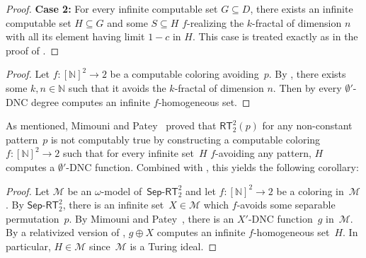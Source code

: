 \documentclass{article}
\newtheorem{theorem}{Theorem}
\numberwithin{theorem}{section}
\newtheorem{corollary}[theorem]{Corollary}
\def\M{\mathcal{M}}
\newcommand{\RT}[0]{\mathsf{RT}}
\newcommand{\coRT}[0]{\mathsf{coRT}}
\newcommand{\SepRT}[0]{\mathsf{Sep}\mbox{-}\mathsf{RT}}
\newcommand{\NN}[0]{\mathbb{N}}
\begin{document}
\begin{proof}
\textbf{Case 2:} For every infinite computable set $G \subseteq D$, there exists an infinite computable set $H \subseteq G$ and some $S \subseteq H$ $f$-realizing the $k$-fractal of dimension $n$ with all its element having limit $1 - c$ in $H$. This case is treated exactly as in the proof of .

\end{proof}

\begin{proof}
Let $f : [\NN]^2 \to 2$ be a computable coloring avoiding~$p$.
By , there exists some $k,n \in \NN$ such that it avoids the $k$-fractal of dimension $n$. Then by  every $\emptyset'$-DNC degree computes an infinite $f$-homogeneous set.
\end{proof}

As mentioned, Mimouni and Patey~\cite{mimouni2025ramseylike} proved that $\RT^2_2(p)$ for any non-constant pattern~$p$ is not computably true by constructing a computable coloring $f : [\NN]^2 \to 2$ such that for every infinite set~$H$ $f$-avoiding any pattern, $H$ computes a $\emptyset'$-DNC function. Combined with , this yields the following corollary:

\begin{proof}
Let $\M$ be an $\omega$-model of~$\SepRT^2_2$
and let $f : [\NN]^2 \to 2$ be a coloring in~$\M$.
By $\SepRT^2_2$, there is an infinite set~$X \in \M$ which $f$-avoids some separable permutation~$p$.
By Mimouni and Patey~\cite{mimouni2025ramseylike}, there is an $X'$-DNC function~$g$ in~$\M$.
By a relativized version of , $g \oplus X$ computes an infinite $f$-homogeneous set~$H$.
In particular, $H \in \M$ since~$\M$ is a Turing ideal.
\end{proof}
\end{document}

